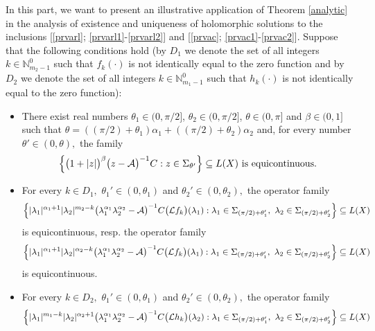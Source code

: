\documentclass{amsart}
\theoremstyle{definition}
\theoremstyle{remark}
\numberwithin{equation}{section}
\begin{document}
In this part, we want to present an illustrative application of Theorem \ref{analytic} in the analysis of existence and uniqueness of holomorphic solutions to the inclusions [\eqref{prvarl}; \eqref{prvarl1}-\eqref{prvarl2}] and [\eqref{prvac}; \eqref{prvac1}-\eqref{prvac2}]. Suppose that the following conditions hold (by $D_{1}$ we denote the set of all integers $k\in {\mathbb N}_{m_{2}-1}^{0}$ such that $f_{k}(\cdot)$ is not identically equal to the zero function and by $D_{2}$ we denote the set of all integers $k\in {\mathbb N}_{m_{1}-1}^{0}$ such that $h_{k}(\cdot)$ is not identically equal to the zero function):
\begin{itemize}
\item[(i)] There exist real numbers $\theta_{1} \in (0,\pi/2]$, $\theta_{2} \in (0,\pi/2]$, $\theta \in (0,\pi]$ and $\beta \in (0,1]$ such that $\theta=((\pi/2)+\theta_{1})\alpha_{1}+((\pi/2)+\theta_{2})\alpha_{2}$ and, for every number $\theta'\in (0,\theta),$ the family  
\begin{align}\label{rate}
\Bigl\{ \bigl(1+|z|\bigr)^{\beta}\bigl( z -{\mathcal A}\bigr)^{-1}C : z\in \Sigma_{\theta'}\Bigr\}\subseteq L(X)\mbox{ is equicontinuous.}   
\end{align}
\item[(ii)] For every $k\in D_{1},$ $\theta_{1}' \in (0,\theta_{1})$ and $\theta_{2}' \in (0,\theta_{2}),$ the operator family{\small
\begin{align*}
\Bigl\{ |\lambda_{1}|^{\alpha_{1}+1}|\lambda_{2}|^{m_{2}-k}\bigl( \lambda_{1}^{\alpha_{1}} \lambda_{2}^{\alpha_{2}} -{\mathcal A}\bigr)^{-1}C \bigl({\mathcal L}f_{k}\bigr)(\lambda_{1}): \lambda_{1}\in \Sigma_{(\pi/2)+\theta_{1}'},\ \lambda_{2}\in \Sigma_{(\pi/2)+\theta_{2}'}\Bigr\}\subseteq L(X)
\end{align*}}
is equicontinuous,
resp.
the operator family{\small
\begin{align*}
\Bigl\{ |\lambda_{1}|^{\alpha_{1}+1}|\lambda_{2}|^{\alpha_{2}-k}\bigl( \lambda_{1}^{\alpha_{1}} \lambda_{2}^{\alpha_{2}} -{\mathcal A}\bigr)^{-1}C \bigl({\mathcal L}f_{k}\bigr)(\lambda_{1}): \lambda_{1}\in \Sigma_{(\pi/2)+\theta_{1}'},\ \lambda_{2}\in \Sigma_{(\pi/2)+\theta_{2}'}\Bigr\}\subseteq L(X)
\end{align*}}
is equicontinuous.
\item[(iii)] For every $k\in D_{2},$ $\theta_{1}' \in (0,\theta_{1})$ and $\theta_{2}' \in (0,\theta_{2}),$ the operator family{\small
\begin{align*}
\Bigl\{ |\lambda_{1}|^{m_{1}-k}|\lambda_{2}|^{\alpha_{2}+1}\bigl( \lambda_{1}^{\alpha_{1}} \lambda_{2}^{\alpha_{2}} -{\mathcal A}\bigr)^{-1}C \bigl({\mathcal L}h_{k}\bigr)(\lambda_{2}): \lambda_{1}\in \Sigma_{(\pi/2)+\theta_{1}'},\ \lambda_{2}\in \Sigma_{(\pi/2)+\theta_{2}'}\Bigr\}\subseteq L(X)

\end{align*}}
\end{itemize}
\end{document}
